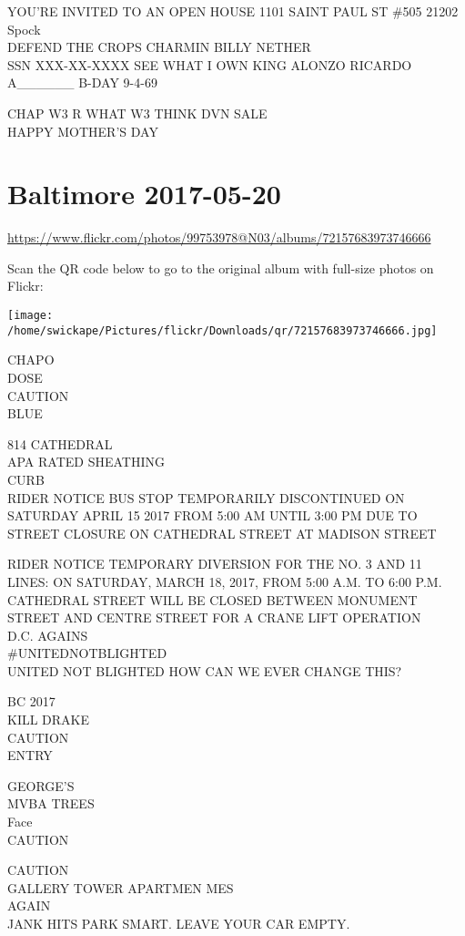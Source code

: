 \documentclass[10pt,letterpaper]{article}
\begin{document}
YOU'RE INVITED TO AN OPEN HOUSE 1101 SAINT PAUL ST \#505 21202\\
Spock\\
DEFEND THE CROPS CHARMIN BILLY NETHER\\
SSN XXX{-}XX{-}XXXX SEE WHAT I OWN KING ALONZO RICARDO A\_\_\_\_\_\_ B{-}DAY 9{-}4{-}69

CHAP W3 R WHAT W3 THINK DVN SALE\\
HAPPY MOTHER'S DAY


\section*{Baltimore 2017-05-20}

\url{https://www.flickr.com/photos/99753978@N03/albums/72157683973746666}

Scan the QR code below to go to the original album with full-size photos on Flickr:

\texttt{[image: /home/swickape/Pictures/flickr/Downloads/qr/72157683973746666.jpg]}


CHAPO\\
DOSE\\
CAUTION\\
BLUE

814 CATHEDRAL\\
APA RATED SHEATHING\\
CURB\\
RIDER NOTICE BUS STOP TEMPORARILY DISCONTINUED ON SATURDAY APRIL 15 2017 FROM 5:00 AM UNTIL 3:00 PM DUE TO STREET CLOSURE ON CATHEDRAL STREET AT MADISON STREET

RIDER NOTICE TEMPORARY DIVERSION FOR THE NO. 3 AND 11 LINES: ON SATURDAY, MARCH 18, 2017, FROM 5:00 A.M. TO 6:00 P.M. CATHEDRAL STREET WILL BE CLOSED BETWEEN MONUMENT STREET AND CENTRE STREET FOR A CRANE LIFT OPERATION\\
D.C. AGAINS\\
\#UNITEDNOTBLIGHTED\\
UNITED NOT BLIGHTED HOW CAN WE EVER CHANGE THIS?

BC 2017\\
KILL DRAKE\\
CAUTION\\
ENTRY

GEORGE'S\\
MVBA TREES\\
Face\\
CAUTION

CAUTION\\
GALLERY TOWER APARTMEN MES\\
AGAIN\\
JANK HITS PARK SMART. LEAVE YOUR CAR EMPTY.
\end{document}
